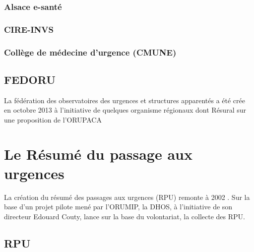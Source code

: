 \documentclass[12pt,english,french,twoside]{report}\usepackage[]{graphicx}\usepackage[]{color}
\begin{document}
  \subsection*{Alsace e-santé}
    
  \subsection*{CIRE-INVS}
    
  \subsection*{Collège de médecine d'urgence (CMUNE)}

\section*{FEDORU}
  
La fédération des observatoires des urgences et structures apparentés a été crée en octobre 2013 à l'initiative de quelques organisme régionaux dont Résural sur une proposition de l'ORUPACA 


\newpage
\chapter{Le Résumé du passage aux urgences}



La création du résumé des passages aux urgences (RPU) remonte à 2002 \cite{11}. Sur la base d'un projet pilote mené par l'ORUMIP, la DHOS, à l'initiative de son directeur Edouard Couty, lance sur la base du volontariat, la collecte des RPU.

\section*{RPU}
\end{document}
